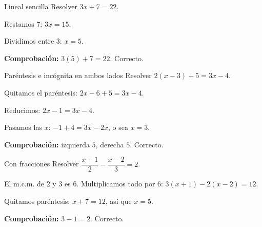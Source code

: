 \begin{center}
\end{center}

\begin{tmejemplo}{Lineal sencilla}
Resolver $3x+7=22$.
\begin{tmpasos}
\item Restamos 7: $3x=15$.
\item Dividimos entre 3: $x=5$.
\item \textbf{Comprobaci\'on:} $3(5)+7=22$. Correcto.
\end{tmpasos}
\end{tmejemplo}

\begin{tmejemplo}{Par\'entesis e inc\'ognita en ambos lados}
Resolver $2(x-3)+5=3x-4$.
\begin{tmpasos}
\item Quitamos el par\'entesis: $2x-6+5=3x-4$.
\item Reducimos: $2x-1=3x-4$.
\item Pasamos las $x$: $-1+4=3x-2x$, o sea $x=3$.
\item \textbf{Comprobaci\'on:} izquierda $5$, derecha $5$. Correcto.
\end{tmpasos}
\end{tmejemplo}

\begin{tmejemplo}{Con fracciones}
Resolver $\dfrac{x+1}{2}-\dfrac{x-2}{3}=2$.
\begin{tmpasos}
\item El m.c.m. de 2 y 3 es 6. Multiplicamos todo por 6: $3(x+1)-2(x-2)=12$.
\item Quitamos par\'entesis: $x+7=12$, as\'i que $x=5$.
\item \textbf{Comprobaci\'on:} $3-1=2$. Correcto.
\end{tmpasos}
\end{tmejemplo}

